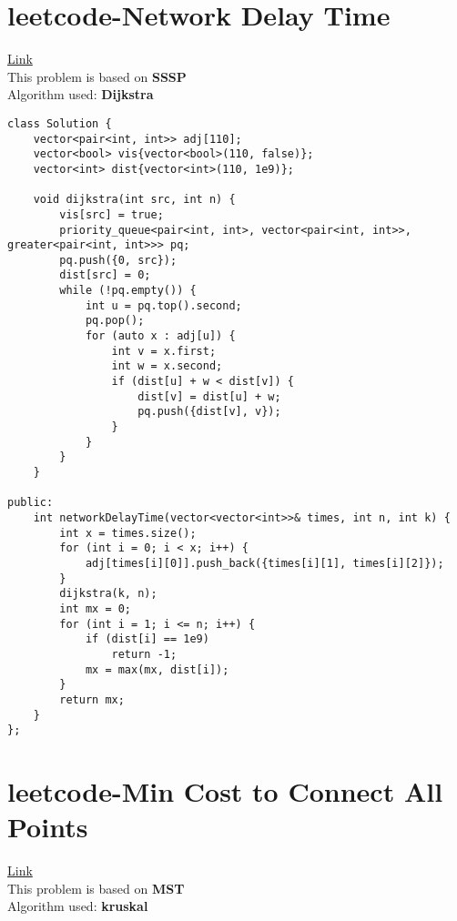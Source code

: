 \documentclass{article}
\begin{document}
\section{leetcode-Network Delay Time} \href{https://leetcode.com/problems/network-delay-time/description/}{Link} \\

This problem is based on  \textbf{  SSSP }\\
Algorithm used: \textbf{Dijkstra }\\

\begin{lstlisting}[style=cppStyle]
class Solution {
    vector<pair<int, int>> adj[110];
    vector<bool> vis{vector<bool>(110, false)};
    vector<int> dist{vector<int>(110, 1e9)};

    void dijkstra(int src, int n) {
        vis[src] = true;
        priority_queue<pair<int, int>, vector<pair<int, int>>, greater<pair<int, int>>> pq;
        pq.push({0, src});
        dist[src] = 0;
        while (!pq.empty()) {
            int u = pq.top().second;
            pq.pop();
            for (auto x : adj[u]) {
                int v = x.first;
                int w = x.second;
                if (dist[u] + w < dist[v]) {
                    dist[v] = dist[u] + w;
                    pq.push({dist[v], v});
                }
            }
        }
    }

public:
    int networkDelayTime(vector<vector<int>>& times, int n, int k) {
        int x = times.size();
        for (int i = 0; i < x; i++) {
            adj[times[i][0]].push_back({times[i][1], times[i][2]});
        }
        dijkstra(k, n);
        int mx = 0;
        for (int i = 1; i <= n; i++) {
            if (dist[i] == 1e9)
                return -1;
            mx = max(mx, dist[i]);
        }
        return mx;
    }
};

\end{lstlisting}


\section{leetcode-Min Cost to Connect All Points} \href{https://leetcode.com/problems/min-cost-to-connect-all-points/description/}{Link} \\

This problem is based on  \textbf{  MST }\\
Algorithm used: \textbf{kruskal}\\
\end{document}
